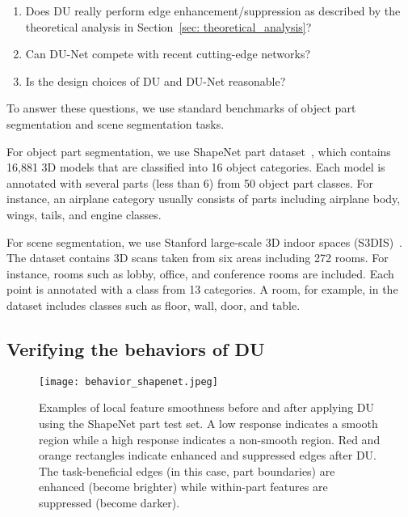 \documentclass[a4paper,fleqn]{cas-dc}
\begin{document}
\begin{enumerate}
\item Does DU really perform edge enhancement/suppression as described by the theoretical analysis in Section~\ref{sec: theoretical_analysis}?
\item Can DU-Net compete with recent cutting-edge networks?
\item Is the design choices of DU and DU-Net reasonable?
\end{enumerate}
To answer these questions, we use standard benchmarks of object part segmentation and scene segmentation tasks.




For object part segmentation, we use ShapeNet part dataset~\cite{yi2016scalable}, which contains 16,881 3D models that are classified into 16 object categories. Each model is annotated with several parts (less than 6) from 50 object part classes. For instance, an airplane category usually consists of parts including airplane body, wings, tails, and engine classes. 



For scene segmentation, we use Stanford large-scale 3D indoor spaces (S3DIS)~\cite{armeni20163d}. The dataset contains 3D scans taken from six areas including 272 rooms. For instance, rooms such as lobby, office, and conference rooms are included. Each point is annotated with a class from 13 categories. A room, for example, in the dataset includes classes such as floor, wall, door, and table.      
\subsection{Verifying the behaviors of DU}
\label{sec: interpretation}
\begin{figure}[t]
    \centering 
        \texttt{[image: behavior\_shapenet.jpeg]}
    \caption{
    Examples of local feature smoothness before and after applying DU using the ShapeNet part test set. A low response indicates a smooth region while a high response indicates a non-smooth region. Red and orange rectangles indicate enhanced and suppressed edges after DU. The task-beneficial edges (in this case, part boundaries) are enhanced (become brighter) while within-part features are suppressed (become darker). 
    }
    \label{fig: behavior_shapenet}
\end{figure}
\end{document}
